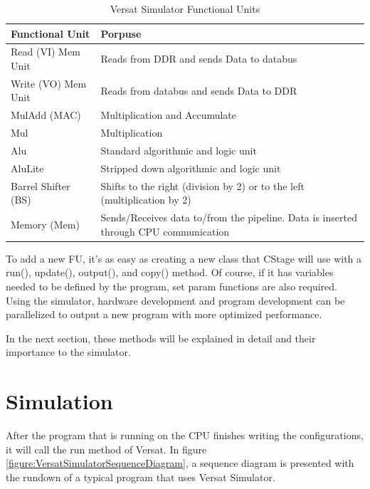 \begin{table}[!htbp]
    \centering
    \begin{tabular}{|ll|}
        \hline
        \textbf{Functional Unit}     & \textbf{Porpuse}  \\  \hline
        Read (VI) Mem Unit             & Reads from DDR and sends Data to databus            \\ \hline
        Write (VO) Mem Unit & Reads from databus and sends Data to DDR             \\ \hline
        MulAdd (MAC)    & Multiplication and Accumulate          \\ \hline
		Mul    & Multiplication     \\ \hline
		Alu    & Standard algorithmic and logic unit     \\ \hline
		AluLite    & Stripped down  algorithmic and logic unit     \\ \hline
		Barrel Shifter (BS) & Shifts to the right (division by 2) or to the left (multiplication by 2) \\ \hline
		Memory (Mem) & Sends/Receives data to/from the pipeline. Data is inserted through CPU communication   \\ \hline
        \end{tabular}
    \caption{Versat Simulator Functional Units}
    \label{table:versatsimfu}
    \end{table}

To add a new FU, it's as easy as creating a new class that CStage will use with
a run(), update(), output(), and copy() method. Of course, if it has variables needed to be defined
by the program, set param functions are also required. Using the simulator, hardware development
and program development can be parallelized to output a new program 
with more optimized performance.

In the next section, these methods will be explained in detail and 
their importance to the simulator.

\section{Simulation}

After the program that is running on the CPU finishes writing the configurations, it will call the run method of Versat.
In figure \ref{figure:VersatSimulatorSequenceDiagram}, a sequence diagram is presented with the rundown
of a typical program that uses Versat Simulator.

